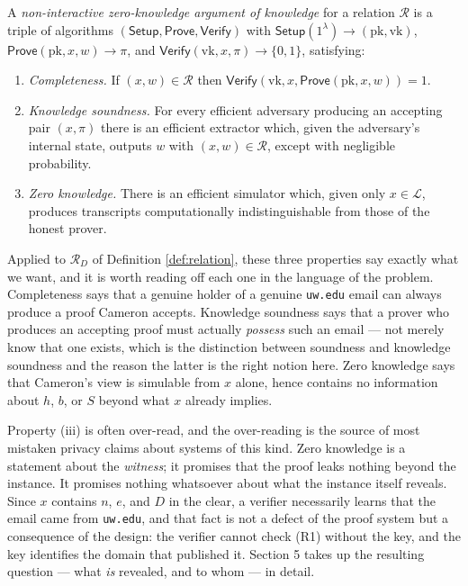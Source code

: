 \documentclass[12pt,reqno]{amsart}
\theoremstyle{definition}
\newcommand{\cL}{\mathcal{L}}
\newcommand{\cR}{\mathcal{R}}
\newcommand{\Setup}{\mathsf{Setup}}
\newcommand{\Prove}{\mathsf{Prove}}
\newcommand{\Verify}{\mathsf{Verify}}
\begin{document}
\begin{definition}
A \emph{non-interactive zero-knowledge argument of knowledge} for a relation
$\cR$ is a triple of algorithms $(\Setup, \Prove, \Verify)$ with
$\Setup(1^{\lambda}) \to (\mathrm{pk}, \mathrm{vk})$,
$\Prove(\mathrm{pk}, x, w) \to \pi$, and
$\Verify(\mathrm{vk}, x, \pi) \to \{0,1\}$,
satisfying:
\begin{enumerate}
\item[(i)] \emph{Completeness.} If $(x,w) \in \cR$ then
  $\Verify(\mathrm{vk}, x, \Prove(\mathrm{pk}, x, w)) = 1$.
\item[(ii)] \emph{Knowledge soundness.} For every efficient adversary producing
  an accepting pair $(x, \pi)$ there is an efficient extractor which, given the
  adversary's internal state, outputs $w$ with $(x,w) \in \cR$, except with
  negligible probability.
\item[(iii)] \emph{Zero knowledge.} There is an efficient simulator which, given
  only $x \in \cL$, produces transcripts computationally indistinguishable from
  those of the honest prover.
\end{enumerate}
\end{definition}
 
Applied to $\cR_{D}$ of Definition \ref{def:relation}, these three properties
say exactly what we want, and it is worth reading off each one in the language of
the problem. Completeness says that a genuine holder of a genuine
\texttt{uw.edu} email can always produce a proof Cameron accepts. Knowledge
soundness says that a prover who produces an accepting proof must actually
\emph{possess} such an email --- not merely know that one exists, which is the
distinction between soundness and knowledge soundness and the reason the latter
is the right notion here. Zero knowledge says that Cameron's view is simulable
from $x$ alone, hence contains no information about $h$, $b$, or $S$ beyond what
$x$ already implies.
 
\begin{remark}
Property (iii) is often over-read, and the over-reading is the source of most
mistaken privacy claims about systems of this kind. Zero knowledge is a statement
about the \emph{witness}; it promises that the proof leaks nothing beyond the
instance. It promises nothing whatsoever about what the instance itself reveals.
Since $x$ contains $n$, $e$, and $D$ in the clear, a verifier necessarily learns
that the email came from \texttt{uw.edu}, and that fact is not a defect of the
proof system but a consequence of the design: the verifier cannot check (R1)
without the key, and the key identifies the domain that published it. Section 5
takes up the resulting question --- what \emph{is} revealed, and to whom --- in
detail.
\end{remark}
 
\end{document}
